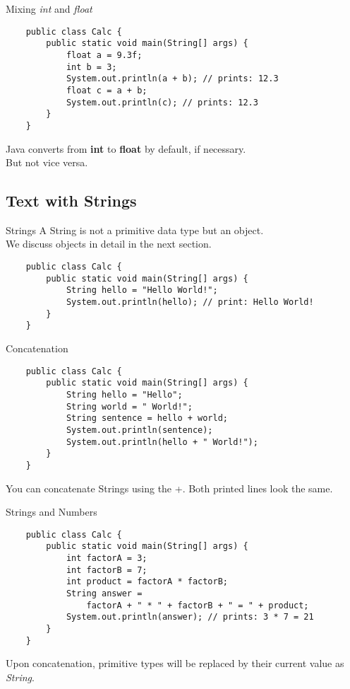 \begin{frame}[fragile]{Mixing \emph{int} and \emph{float}}
    \begin{lstlisting}
    public class Calc {
        public static void main(String[] args) {
            float a = 9.3f;
            int b = 3;
            System.out.println(a + b); // prints: 12.3
            float c = a + b;
            System.out.println(c); // prints: 12.3
        }
    }
    \end{lstlisting}
    Java converts from \textbf{int} to \textbf{float} by default, if necessary. \\
    But not vice versa.
\end{frame}

\subsection{Text with Strings}

\begin{frame}[fragile]{Strings}
    A String is not a primitive data type but an object. \\
    We discuss objects in detail in the next section.
    \begin{lstlisting}
    public class Calc {
        public static void main(String[] args) {
            String hello = "Hello World!";
            System.out.println(hello); // print: Hello World!
        }
    }
    \end{lstlisting}
\end{frame}

\begin{frame}[fragile]{Concatenation}
    \begin{lstlisting}
    public class Calc {
        public static void main(String[] args) {
            String hello = "Hello";
            String world = " World!";
            String sentence = hello + world;
            System.out.println(sentence);
            System.out.println(hello + " World!");
        }
    }
    \end{lstlisting}
    You can concatenate Strings using the +. Both printed lines look the same.
\end{frame}

\begin{frame}[fragile]{Strings and Numbers}
    \begin{lstlisting}
    public class Calc {
        public static void main(String[] args) {
            int factorA = 3;
            int factorB = 7;
            int product = factorA * factorB;
            String answer =
                factorA + " * " + factorB + " = " + product;
            System.out.println(answer); // prints: 3 * 7 = 21
        }
    }
    \end{lstlisting}
    Upon concatenation, primitive types will be replaced by their current value as \emph{String}.
\end{frame}


